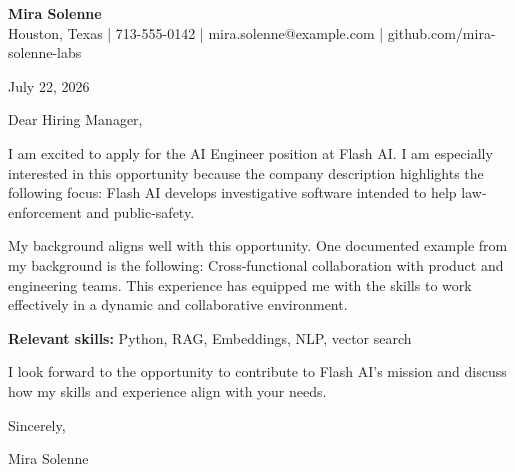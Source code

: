 \documentclass[11pt]{article}
\begin{document}
\begin{center}
{\Large\bfseries Mira Solenne}\\
Houston, Texas | 713-555-0142 | mira.solenne@example.com | github.com/mira-solenne-labs
\end{center}

July 22, 2026

Dear Hiring Manager,

I am excited to apply for the AI Engineer position at Flash AI. I am especially interested in this opportunity because the company description highlights the following focus: Flash AI develops investigative software intended to help law-enforcement and public-safety.

My background aligns well with this opportunity. One documented example from my background is the following: Cross-functional collaboration with product and engineering teams. This experience has equipped me with the skills to work effectively in a dynamic and collaborative environment.

\textbf{Relevant skills:} Python, RAG, Embeddings, NLP, vector search

I look forward to the opportunity to contribute to Flash AI's mission and discuss how my skills and experience align with your needs.

Sincerely,

Mira Solenne
\end{document}
